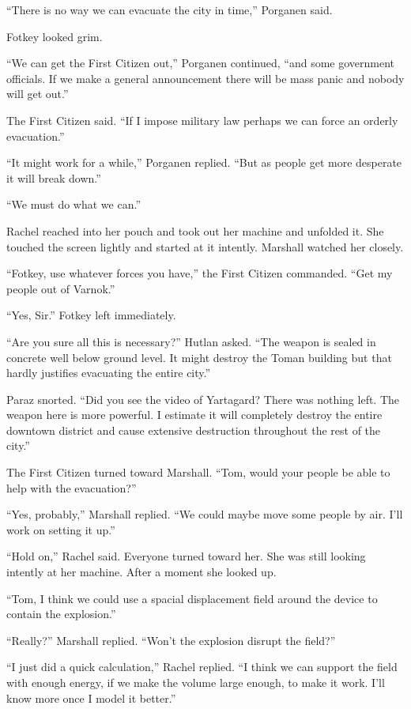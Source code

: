 
``There is no way we can evacuate the city in time,'' Porganen said.

Fotkey looked grim.

``We can get the First Citizen out,'' Porganen continued, ``and some government officials. If we
make a general announcement there will be mass panic and nobody will get out.''

The First Citizen said. ``If I impose military law perhaps we can force an orderly evacuation.''

``It might work for a while,'' Porganen replied. ``But as people get more desperate it will
break down.''

``We must do what we can.''

Rachel reached into her pouch and took out her machine and unfolded it. She touched the screen
lightly and started at it intently. Marshall watched her closely.

``Fotkey, use whatever forces you have,'' the First Citizen commanded. ``Get my people out of
Varnok.''

``Yes, Sir.'' Fotkey left immediately.

``Are you sure all this is necessary?'' Hutlan asked. ``The weapon is sealed in concrete well
below ground level. It might destroy the Toman building but that hardly justifies evacuating the
entire city.''

Paraz snorted. ``Did you see the video of Yartagard? There was nothing left. The weapon here is
more powerful. I estimate it will completely destroy the entire downtown district and cause
extensive destruction throughout the rest of the city.''

The First Citizen turned toward Marshall. ``Tom, would your people be able to help with the
evacuation?''

``Yes, probably,'' Marshall replied. ``We could maybe move some people by air. I'll work on
setting it up.''

``Hold on,'' Rachel said. Everyone turned toward her. She was still looking intently at her
machine. After a moment she looked up.

``Tom, I think we could use a spacial displacement field around the device to contain the
explosion.''

``Really?'' Marshall replied. ``Won't the explosion disrupt the field?''

``I just did a quick calculation,'' Rachel replied. ``I think we can support the field with
enough energy, if we make the volume large enough, to make it work. I'll know more once I model
it better.''

